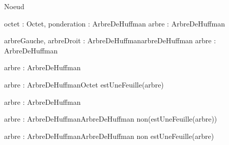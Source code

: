 \begin{algorithme}


\begin{enregistrement}{Noeud}
\end{enregistrement}

    {octet : Octet, ponderation : \naturel}{ArbreDeHuffman}
    {}{arbre : ArbreDeHuffman}
{
}

    {arbreGauche, arbreDroit : ArbreDeHuffman}{arbreDeHuffman}
    {}{arbre : ArbreDeHuffman}
{
}

    {arbre : ArbreDeHuffman}{\naturel}
    {}{}
{
}

    {arbre : ArbreDeHuffman}{Octet}
    {estUneFeuille(arbre)}{}
{
}

    {arbre : ArbreDeHuffman}{\booleen}
    {}{}
{
}

    {arbre : ArbreDeHuffman}{ArbreDeHuffman}
    {non(estUneFeuille(arbre))}{}
{
}

    {arbre : ArbreDeHuffman}{ArbreDeHuffman}
    {non estUneFeuille(arbre)}{}
{
}

\end{algorithme}
